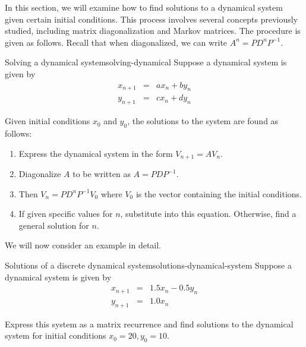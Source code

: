 In this section, we will examine how to find solutions to a dynamical system given certain initial conditions. This process involves several concepts previously studied, including matrix diagonalization and Markov matrices. The procedure is given as follows. Recall that when diagonalized, we can write $A^{n} = PD^{n}P^{-1}$. 

\begin{procedure}{Solving a dynamical system}{solving-dynamical}
Suppose a dynamical system is given by  
\begin{eqnarray*}
x_{n+1} &=& a x_n + b y_n \\
y_{n+1} &=& c x_n + d y_n
\end{eqnarray*}

Given initial conditions $x_0$ and $y_0$, the solutions to the system are found as follows:
\begin{enumerate}
\item
Express the dynamical system in the form $V_{n+1} = AV_n$.
\item
Diagonalize $A$ to be written as $A = PDP^{-1}$.
\item 
Then $V_{n} = PD^{n} P^{-1} V_{0}$ where $V_{0}$ is the vector containing the initial conditions. 
\item
If given specific values for $n$, substitute into this equation. Otherwise, find a general solution for $n$.
\end{enumerate}
\end{procedure}

We will now consider an example in detail.

\begin{example}{Solutions of a discrete dynamical system}{solutions-dynamical-system}
Suppose a dynamical system is given by 
\begin{eqnarray*}
x_{n+1} &=& 1.5 x_n - 0.5y_n\\
y_{n+1} &=& 1.0 x_n
\end{eqnarray*}

Express this system as a matrix recurrence and find solutions to the dynamical system for initial conditions $x_0=20, y_0=10$. 
\end{example}

